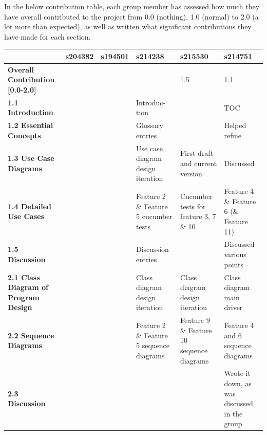 \noindent In the below contribution table, each group member has assessed how much they have overall contributed to the project from 0.0 (nothing), 1.0 (normal) to 2.0 (a lot more than expected), as well as written what significant contributions they have made for each section.
\begin{table}[htbp]
\centering
\label{your-label}
\begin{tabularx}{\textwidth}{|p{5cm}|X|X|X|X|X|}
\hline
 & \textbf{s204382} & \textbf{s194501} & \textbf{s214238} & \textbf{s215530} & \textbf{s214751} \\ \hline
\textbf{Overall Contribution [0.0-2.0]} &  &  &  & 1.5 & 1.1 \\ \hline
\textbf{1.1 Introduction} &  &  & Introduc- tion &  & TOC \\ \hline
\textbf{1.2 Essential Concepts} &  &  & Glossary entries &  & Helped refine\\ \hline
\textbf{1.3 Use Case Diagrams} &  &  & Use case diagram design iteration & First draft and current version & Discussed \\ \hline
\textbf{1.4 Detailed Use Cases} &  &  & Feature 2 \& Feature 5 cucumber tests & Cucumber tests for feature 3, 7 \& 10  &  Feature 4 \& Feature 6 (\& Feature 11)\\ \hline
\textbf{1.5 Discussion} &  &  & Discussion entries &  &  Discussed various points\\ \hline
\textbf{2.1 Class Diagram of Program Design} &  &  & Class diagram design iteration & Class diagram design iteration & Class diagram main driver \\ \hline
\textbf{2.2 Sequence Diagrams} &  &  & Feature 2 \& Feature 5 sequence diagrams & Feature 9 \& Feature 10 sequence diagrams & Feature 4 and 6 sequence diagrams\\ \hline
\textbf{2.3 Discussion} &  &  &  &  & Wrote it down, as was discussed in the group \\ \hline
\end{tabularx}
\end{table}